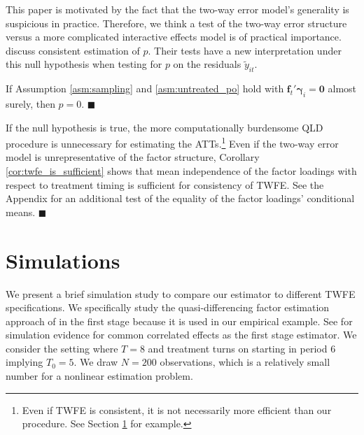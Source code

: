 \documentclass[12pt]{article}
\begin{document}
\begin{remark}\label{remark:twfe_testing}
  This paper is motivated by the fact that the two-way error model's generality is suspicious in practice. Therefore, we think a test of the two-way error structure versus a more complicated interactive effects model is of practical importance. \citet{Ahn_Lee_Schmidt_2013} discuss consistent estimation of $p$. Their tests have a new interpretation under this null hypothesis when testing for $p$ on the residuals $\tilde{y}_{it}$.

  \begin{theorem}
    If Assumption \ref{asm:sampling} and \ref{asm:untreated_po} hold with $\bm f_t' \bm \gamma_i = \bm 0$ almost surely, then $p = 0$. $\blacksquare$
  \end{theorem}
  If the null hypothesis is true, the more computationally burdensome QLD procedure is unnecessary for estimating the ATTs.\footnote{Even if TWFE is consistent, it is not necessarily more efficient than our procedure. See Section \ref{sec:simulations} for example.} Even if the two-way error model is unrepresentative of the factor structure, Corollary \ref{cor:twfe_is_sufficient} shows that mean independence of the factor loadings with respect to treatment timing is sufficient for consistency of TWFE. See the Appendix for an additional test of the equality of the factor loadings' conditional means. $\blacksquare$
\end{remark}


\section{Simulations}\label{sec:simulations}

We present a brief simulation study to compare our estimator to different TWFE specifications. We specifically study the quasi-differencing factor estimation approach of \citet{Ahn_Lee_Schmidt_2013} in the first stage because it is used in our empirical example. See \citet{Brown_Butts_Westerlund_2023} for simulation evidence for common correlated effects as the first stage estimator. We consider the setting where $T = 8$ and treatment turns on starting in period 6 implying $T_0 = 5$. We draw $N = 200$ observations, which is a relatively small number for a nonlinear estimation problem.
\end{document}
